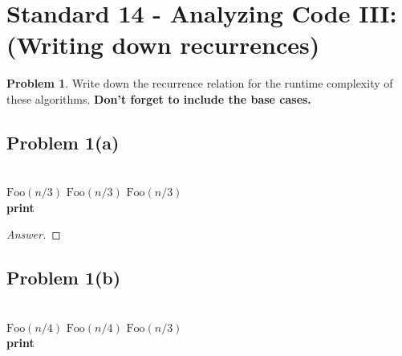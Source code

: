 \documentclass[11pt]{article}
\theoremstyle{definition}
\theoremstyle{definition}
\newtheorem{required}{Problem}
\theoremstyle{definition}
\begin{document}
\newpage
\section{Standard 14 - Analyzing Code III: (Writing down recurrences)}

\begin{required} \label{Recursive1}
Write down the recurrence relation for the runtime complexity of these algorithms. \textbf{Don't forget to include the base cases.}

\subsection{Problem 1(a)}

\begin{algorithm}
\caption{Writing Recurrences 1}\label{alg:Recurrence1}
\begin{algorithmic}[1]
\Return
\EndIf

\noindent \\
\State $\text{Foo}(n/3)$
\State $\text{Foo}(n/3)$
\State $\text{Foo}(n/3)$ \\

	\State \textbf{print} 
\EndFor
\EndProcedure
\end{algorithmic}
\end{algorithm}

\begin{proof}[Answer]
\end{proof}


\begin{comment}
\begin{align*}
T(n) &= \begin{cases}
5 & : \text{if } n \geq 0, \\
7 & : \text{if } n < 0.
\end{cases}
\end{align*}
\end{comment}




\newpage


\subsection{Problem 1(b)}

\begin{algorithm}
\caption{Writing Recurrences 2}\label{alg:Recurrence2}
\begin{algorithmic}[1]
\Return
\EndIf

\noindent \\
\State $\text{Foo}(n/4)$
\State $\text{Foo}(n/4)$
\State $\text{Foo}(n/3)$ \\

	\State \textbf{print} 
\EndFor
\EndProcedure
\end{algorithmic}
\end{algorithm}
\end{required}
\end{document}
